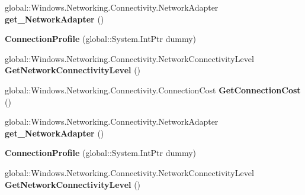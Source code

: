 \begin{DoxyCompactItemize}
\item 
\mbox{\label{class_windows_1_1_networking_1_1_connectivity_1_1_connection_profile_abdb5960f62ef424cf00e068722320644}} 
global\+::\+Windows.\+Networking.\+Connectivity.\+Network\+Adapter {\bfseries get\+\_\+\+Network\+Adapter} ()
\item 
\mbox{\label{class_windows_1_1_networking_1_1_connectivity_1_1_connection_profile_a6c18da83d8ed539cff89b26e114d89c5}} 
{\bfseries Connection\+Profile} (global\+::\+System.\+Int\+Ptr dummy)
\item 
\mbox{\label{class_windows_1_1_networking_1_1_connectivity_1_1_connection_profile_a55f464bd3626b3b75fff3314aa21599b}} 
global\+::\+Windows.\+Networking.\+Connectivity.\+Network\+Connectivity\+Level {\bfseries Get\+Network\+Connectivity\+Level} ()
\item 
\mbox{\label{class_windows_1_1_networking_1_1_connectivity_1_1_connection_profile_a01bd6c7e7e919529b206485420bd6f60}} 
global\+::\+Windows.\+Networking.\+Connectivity.\+Connection\+Cost {\bfseries Get\+Connection\+Cost} ()
\item 
\mbox{\label{class_windows_1_1_networking_1_1_connectivity_1_1_connection_profile_abdb5960f62ef424cf00e068722320644}} 
global\+::\+Windows.\+Networking.\+Connectivity.\+Network\+Adapter {\bfseries get\+\_\+\+Network\+Adapter} ()
\item 
\mbox{\label{class_windows_1_1_networking_1_1_connectivity_1_1_connection_profile_a6c18da83d8ed539cff89b26e114d89c5}} 
{\bfseries Connection\+Profile} (global\+::\+System.\+Int\+Ptr dummy)
\item 
\mbox{\label{class_windows_1_1_networking_1_1_connectivity_1_1_connection_profile_a55f464bd3626b3b75fff3314aa21599b}} 
global\+::\+Windows.\+Networking.\+Connectivity.\+Network\+Connectivity\+Level {\bfseries Get\+Network\+Connectivity\+Level} ()

\end{DoxyCompactItemize}
